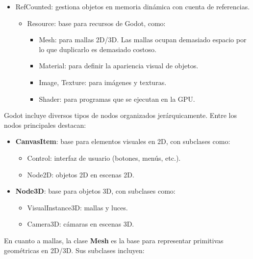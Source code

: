 \documentclass[12pt]{report} %
\providecommand{\tightlist}{%
  \setlength{\itemsep}{0pt}\setlength{\parskip}{0pt}}
\begin{document}
\begin{itemize}
\tightlist
\item
  RefCounted: gestiona objetos en memoria dinámica con cuenta de
  referencias.

  \begin{itemize}
  \tightlist
  \item
    Resource: base para recursos de Godot, como:

    \begin{itemize}
    \tightlist
    \item
      Mesh: para mallas 2D/3D. Las mallas ocupan demasiado espacio por
      lo que duplicarlo es demasiado costoso.
    \item
      Material: para definir la apariencia visual de objetos.
    \item
      Image, Texture: para imágenes y texturas.
    \item
      Shader: para programas que se ejecutan en la GPU.
    \end{itemize}
  \end{itemize}
\end{itemize}

Godot incluye diversos tipos de nodos organizados jerárquicamente. Entre
los nodos principales destacan:

\begin{itemize}
\tightlist
\item
  \textbf{CanvasItem}: base para elementos visuales en 2D, con subclases
  como:

  \begin{itemize}
  \tightlist
  \item
    Control: interfaz de usuario (botones, menús, etc.).
  \item
    Node2D: objetos 2D en escenas 2D.
  \end{itemize}
\item
  \textbf{Node3D}: base para objetos 3D, con subclases como:

  \begin{itemize}
  \tightlist
  \item
    VisualInstance3D: mallas y luces.
  \item
    Camera3D: cámaras en escenas 3D.
  \end{itemize}
\end{itemize}

En cuanto a mallas, la clase \textbf{Mesh} es la base para representar
primitivas geométricas en 2D/3D. Sus subclases incluyen:
\end{document}

